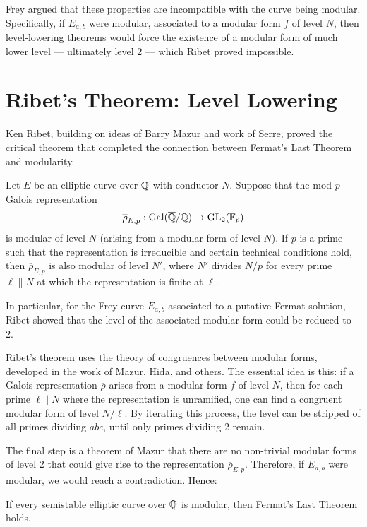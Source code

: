 Frey argued that these properties are incompatible with the curve being modular. Specifically, if \(E_{a,b}\) were modular, associated to a modular form \(f\) of level \(N\), then level-lowering theorems would force the existence of a modular form of much lower level --- ultimately level 2 --- which Ribet proved impossible.

\section{Ribet's Theorem: Level Lowering}

Ken Ribet, building on ideas of Barry Mazur and work of Serre, proved the critical theorem that completed the connection between Fermat's Last Theorem and modularity.

\begin{theorem}
Let \(E\) be an elliptic curve over \(\mathbb{Q}\) with conductor \(N\). Suppose that the mod \(p\) Galois representation
\[
\overline{\rho}_{E,p}: \operatorname{Gal}(\overline{\mathbb{Q}}/\mathbb{Q}) \to \operatorname{GL}_2(\mathbb{F}_p)
\]
is modular of level \(N\) (arising from a modular form of level \(N\)). If \(p\) is a prime such that the representation is irreducible and certain technical conditions hold, then \(\overline{\rho}_{E,p}\) is also modular of level \(N'\), where \(N'\) divides \(N/p\) for every prime \(\ell \parallel N\) at which the representation is finite at \(\ell\).

In particular, for the Frey curve \(E_{a,b}\) associated to a putative Fermat solution, Ribet showed that the level of the associated modular form could be reduced to 2.
\end{theorem}

Ribet's theorem uses the theory of congruences between modular forms, developed in the work of Mazur, Hida, and others. The essential idea is this: if a Galois representation \(\overline{\rho}\) arises from a modular form \(f\) of level \(N\), then for each prime \(\ell \mid N\) where the representation is unramified, one can find a congruent modular form of level \(N/\ell\). By iterating this process, the level can be stripped of all primes dividing \(abc\), until only primes dividing 2 remain.

The final step is a theorem of Mazur that there are no non-trivial modular forms of level 2 that could give rise to the representation \(\overline{\rho}_{E,p}\). Therefore, if \(E_{a,b}\) were modular, we would reach a contradiction. Hence:

\begin{corollary}
If every semistable elliptic curve over \(\mathbb{Q}\) is modular, then Fermat's Last Theorem holds.
\end{corollary}

